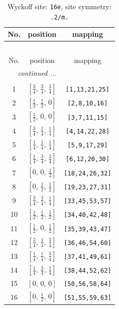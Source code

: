 \documentclass[fleqn,8pt]{jsarticle}
\begin{document}
\renewcommand{\arraystretch}{1.2}
\begin{longtable}{ccc}
\caption{Wyckoff site: {\tt 16e}, site symmetry: {\tt .2/m.}}
 \\
 \hline \hline
No. & position & mapping \\ \hline \endfirsthead

\multicolumn{2}{l}{\tablename\ \thetable{}} \\
 \hline \hline
No. & position & mapping \\ \hline \endhead

 \hline \hline
\multicolumn{2}{r}{\footnotesize\it continued ...} \\ \endfoot

 \hline \hline
\multicolumn{2}{r}{} \\ \endlastfoot

1 & $\left[ \frac{3}{4},\, \frac{3}{4},\, \frac{3}{4} \right]$ & {\tt [1,13,21,25]} \\ \hline
2 & $\left[ \frac{1}{2},\, \frac{1}{2},\, 0 \right]$ & {\tt [2,8,10,16]} \\ \hline
3 & $\left[ \frac{1}{2},\, 0,\, 0 \right]$ & {\tt [3,7,11,15]} \\ \hline
4 & $\left[ \frac{3}{4},\, \frac{1}{4},\, \frac{1}{4} \right]$ & {\tt [4,14,22,28]} \\ \hline
5 & $\left[ \frac{1}{4},\, \frac{1}{4},\, \frac{1}{4} \right]$ & {\tt [5,9,17,29]} \\ \hline
6 & $\left[ \frac{1}{4},\, \frac{3}{4},\, \frac{3}{4} \right]$ & {\tt [6,12,20,30]} \\ \hline
7 & $\left[ 0,\, 0,\, \frac{1}{2} \right]$ & {\tt [18,24,26,32]} \\ \hline
8 & $\left[ 0,\, \frac{1}{2},\, \frac{1}{2} \right]$ & {\tt [19,23,27,31]} \\ \hline
9 & $\left[ \frac{3}{4},\, \frac{3}{4},\, \frac{1}{4} \right]$ & {\tt [33,45,53,57]} \\ \hline
10 & $\left[ \frac{1}{2},\, \frac{1}{2},\, \frac{1}{2} \right]$ & {\tt [34,40,42,48]} \\ \hline
11 & $\left[ \frac{1}{2},\, 0,\, \frac{1}{2} \right]$ & {\tt [35,39,43,47]} \\ \hline
12 & $\left[ \frac{3}{4},\, \frac{1}{4},\, \frac{3}{4} \right]$ & {\tt [36,46,54,60]} \\ \hline
13 & $\left[ \frac{1}{4},\, \frac{1}{4},\, \frac{3}{4} \right]$ & {\tt [37,41,49,61]} \\ \hline
14 & $\left[ \frac{1}{4},\, \frac{3}{4},\, \frac{1}{4} \right]$ & {\tt [38,44,52,62]} \\ \hline
15 & $\left[ 0,\, 0,\, 0 \right]$ & {\tt [50,56,58,64]} \\ \hline
16 & $\left[ 0,\, \frac{1}{2},\, 0 \right]$ & {\tt [51,55,59,63]} \\
\end{longtable}
\end{document}

